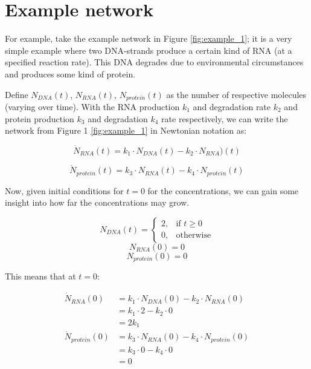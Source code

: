 \documentclass[]{article}
\begin{document}
\section{Example network}
For example, take the example network in Figure \ref{fig:example_1}; it is a very simple example where two DNA-strands produce a certain kind of RNA (at a specified reaction rate). This DNA degrades due to environmental circumstances and produces some kind of protein.

Define $N_{DNA}(t)$, $N_{RNA}(t)$, $N_{protein}(t)$ as the number of respective molecules (varying over time). With the RNA production $k_1$ and degradation rate $k_2$ and protein production  $k_3$ and degradation $k_4$ rate respectively, we can write the network from Figure 1 \ref{fig:example_1} in Newtonian notation as: 

\begin{equation}
\dot{N}_{RNA}(t) = k_1 \cdot N_{DNA}(t) - k_2 \cdot N_{RNA})(t)
\end{equation}

\begin{equation}
\dot{N}_{protein}(t) = k_3 \cdot N_{RNA}(t) - k_4 \cdot N_{protein}(t)
\end{equation}

Now, given initial conditions for $t=0$ for the concentrations, we can gain some insight into how far the concentrations may grow.

\begin{equation}
    N_{DNA}(t)= 
\begin{cases}
    2,& \text{if } t\geq 0\\
    0,              & \text{otherwise}
\end{cases}
\end{equation}
\begin{equation}
N_{RNA}(0) = 0
\end{equation}
\begin{equation}
N_{protein}(0) = 0
\end{equation}

This means that at $t=0$:

\begin{equation}
	\begin{aligned}
	\dot{N}_{RNA}(0) &= k_1 \cdot N_{DNA}(0) - k_2 \cdot N_{RNA}(0)\\
	&= k_1 \cdot 2 - k_2 \cdot 0\\
	&= 2 k_1 \\
	\dot{N}_{protein}(0)& = k_3 \cdot N_{RNA}(0) - k_4 \cdot N_{protein}(0)\\
	&= k_3 \cdot 0 - k_4 \cdot 0 \\
	&= 0
	\end{aligned}
\end{equation}
\end{document}
